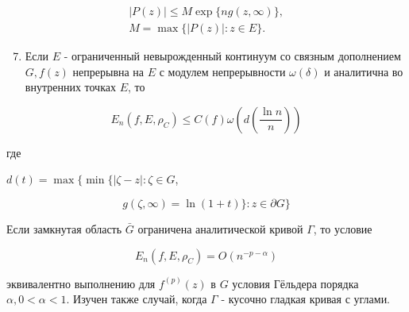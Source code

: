 \documentclass[10pt]{article}
\begin{document}
\[

\begin{gathered}

|P(z)| \leqslant M \exp \{n g(z, \infty)\}, \\

M=\max \{|P(z)|: z \in E\} .

\end{gathered}

\]



\begin{enumerate}

  \setcounter{enumi}{6}

  \item Если $E$ - ограниченный невырожденный континуум со связным дополнением $G, f(z)$ непрерывна на $E$ с модулем непрерывности $\omega(\delta)$ и аналитична во внутренних точках $E$, то

\end{enumerate}



\[

E_{n}\left(f, E, \rho_{C}\right) \leqslant C(f) \omega\left(d\left(\frac{\ln n}{n}\right)\right)

\]



где



$d(t)=\max \{\min \{|\zeta-z|: \zeta \in G$,



\[

g(\zeta, \infty)=\ln (1+t)\}: z \in \partial G\}

\]



Если замкнутая область $\bar{G}$ ограничена аналитической кривой $\Gamma$, то условие



\[

E_{n}\left(f, E, \rho_{C}\right)=O\left(n^{-p-\alpha}\right)

\]



эквивалентно выполнению для $f^{(p)}(z)$ в $G$ условия Гёльдера порядка $\alpha, 0<\alpha<1$. Изучен также случай, когда $\Gamma$ - кусочно гладкая кривая с углами.
\end{document}
